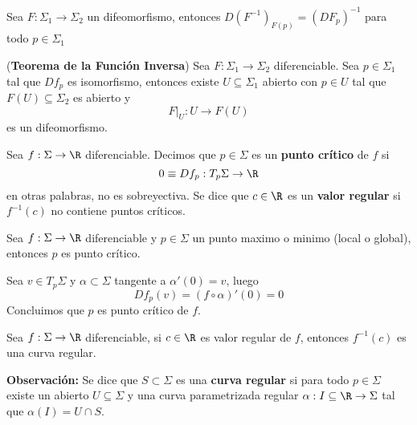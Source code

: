 \documentclass{article}
\begin{document}
\begin{cor}
    Sea $F:\Sigma_{1}\to\Sigma_{2}$ un difeomorfismo, entonces $D(F^{-1})_{F(p)}=(DF_{p})^{-1}$ 
    para todo $p\in\Sigma_{1}$
\end{cor}

\begin{teo}
    (\textbf{Teorema de la Función Inversa}) Sea $F:\Sigma_{1}\to\Sigma_{2}$ diferenciable. Sea 
    $p\in\Sigma_{1}$ tal que $Df_{p}$ es isomorfismo, entonces existe $U\subseteq\Sigma_{1}$ 
    abierto con $p\in U$ tal que $F(U)\subseteq\Sigma_{2}$ es abierto y
    \begin{equation*}
        F\Big|_{U}:U\to F(U)
    \end{equation*}
    es un difeomorfismo.
\end{teo}

\begin{dfn}
    Sea $f:\Sigma\to\R$ diferenciable. Decimos que $p\in\Sigma$ es un \textbf{punto crítico} de 
    $f$ si
    \begin{equation*}
        0\equiv Df_{p}:T_{p}\Sigma\to\R
    \end{equation*}
    en otras palabras, no es sobreyectiva. Se dice que $c\in\R$ es un \textbf{valor regular} si 
    $f^{-1}(c)$ no contiene puntos críticos.
\end{dfn}

\begin{prop}
    Sea $f:\Sigma\to\R$ diferenciable y $p\in\Sigma$ un punto maximo o minimo (local o global),
    entonces $p$ es punto crítico.
\end{prop}
\begin{dem}
    Sea $v\in T_{p}\Sigma$ y $\alpha\subset\Sigma$ tangente a $\alpha'(0)=v$, luego
    \begin{equation*}
        Df_{p}(v)=(f\circ\alpha)'(0)=0
    \end{equation*}
    Concluimos que $p$ es punto crítico de $f$.
\end{dem}

\begin{teo}
    Sea $f:\Sigma\to\R$ diferenciable, si $c\in\R$ es valor regular de $f$, entonces $f^{-1}(c)$
    es una curva regular.
\end{teo}

\noindent\textbf{Observación:} Se dice que $S\subset\Sigma$ es una \textbf{curva regular} si para
todo $p\in\Sigma$ existe un abierto $U\subseteq\Sigma$ y una curva parametrizada regular
$\alpha:I\subseteq\R\to\Sigma$ tal que $\alpha(I)=U\cap S$.
\end{document}
